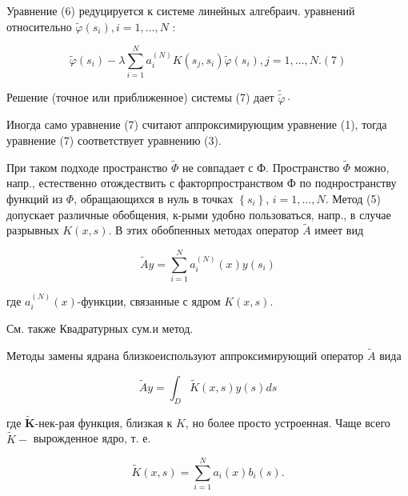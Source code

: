 \documentclass[10pt]{article}
\begin{document}
Уравнение (6) редуцируется к системе линейных алгебраич. уравнений относительно $\tilde{\varphi}\left(s_{i}\right), i=1, \ldots, N$ :



\[

\tilde{\varphi}\left(s_{i}\right)-\lambda \sum_{i=1}^{N} a_{i}^{(N)} K\left(s_{j}, s_{i}\right) \tilde{\varphi}\left(s_{i}\right), j=1, \ldots, N .(7)

\]



Решение (точное или приближенное) системы (7) дает $\tilde{\tilde{\varphi}} \cdot$



Иногда само уравнение (7) считают аппроксимирующим уравнение (1), тогда уравнение (7) соответствует уравнению (3).



При таком подходе пространство $\tilde{\Phi}$ не совпадает с Ф. Пространство $\tilde{\Phi}$ можно, напр., естественно отождествить с факторпространством Ф по поднространству функций из $\Phi$, обращающихся в нуль в точках $\left\{s_{i}\right\}$, $i=1, \ldots, N$. Метод (5) допускает различные обобщения, к-рыми удобно пользоваться, напр., в случае разрывных $K(x, s)$. В этих обобпенных методах оператор $\tilde{A}$ имеет вид



\[

\tilde{A} y=\sum_{i=1}^{N} a_{i}^{(N)}(x) y\left(s_{i}\right)

\]



где $a_{i}^{(N)}(x)$-функции, связанные с ядром $K(x, s)$.



См. также Квадратурных сум.и метод.



Методы замены ядрана близкоеиспользуют аппроксимирующий оператор $\tilde{A}$ вида



\[

\tilde{A} y=\int_{D} \tilde{K}(x, s) y(s) d s

\]



где $\tilde{\boldsymbol{K}}$-нек-рая функция, близкая к $K$, но более просто устроенная. Чаще всего $\tilde{K}-$ вырожденное ядро, т. е.



\[

\tilde{K}(x, s)=\sum_{i=1}^{N} a_{i}(x) b_{i}(s) .

\]
\end{document}
